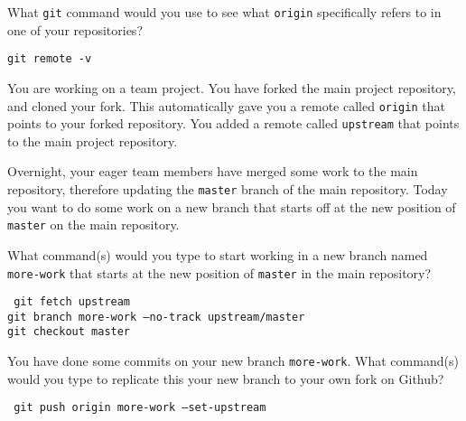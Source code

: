 \documentclass[10pt]{examdesign}
\begin{document}
\begin{shortanswer}[title={Short Answer},
                    rearrange=no,resetcounter=no]
\begin{block}[questions=3]
\begin{question}
  What \texttt{git} command would you use to see what \texttt{origin}
  specifically refers to in one of your repositories?
  \vspace{5mm}
  \begin{answer}
    \texttt{git remote -v}
  \end{answer}
\end{question}
\end{block}

\begin{block}[questions=1]

You are working on a team project.  You have forked the main project
repository, and cloned your fork.  This automatically gave you a remote called
\texttt{origin} that points to your forked repository.  You added a remote
called \texttt{upstream} that points to the main project repository.

Overnight, your eager team members have merged some work to the main
repository, therefore updating the \texttt{master} branch of the main
repository.  Today you want to do some work on a new branch that starts off at
the new position of \texttt{master} on the main repository.

\begin{question}

    What command(s) would you type to start working in a new branch named
    \texttt{more-work} that starts at the new position of \texttt{master} in
    the main repository?

    \vspace{80mm}
    \begin{answer}
        \texttt{
            git fetch upstream \\
            git branch more-work --no-track upstream/master \\
            git checkout master
        }
    \end{answer}

\end{question}

\begin{question}

    You have done some commits on your new branch \texttt{more-work}.  What
    command(s) would you type to replicate this your new branch to your own
    fork on Github?

    \vspace{80mm}
    \begin{answer}
        \texttt{
            git push origin more-work --set-upstream
        }
    \end{answer}

\end{question}

\end{block}

\end{shortanswer}
\end{document}

